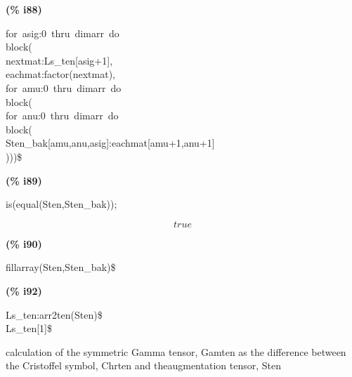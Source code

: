 \documentclass[fleqn]{article}
\begin{document}
\noindent
\begin{minipage}[t]{4.000000em}\color{red}\bfseries
(\% i88)	
\end{minipage}
\begin{minipage}[t]{\textwidth}\color{blue}
for\ asig:0\ thru\ dimarr\ do\\
block(\\
nextmat:Ls\_ten[asig+1],\\
eachmat:factor(nextmat),\\
for\ amu:0\ thru\ dimarr\ do\\
block(\\
for\ anu:0\ thru\ dimarr\ do\\
block(\\
Sten\_bak[amu,anu,asig]:eachmat[amu+1,anu+1]\\
)))\$
\end{minipage}

\noindent%



\noindent
\begin{minipage}[t]{4.000000em}\color{red}\bfseries
(\% i89)	
\end{minipage}
\begin{minipage}[t]{\textwidth}\color{blue}
is(equal(Sten,Sten\_bak));
\end{minipage}
\[\displaystyle \tag{\% o89} 
true\mbox{}
\]


\noindent
\begin{minipage}[t]{4.000000em}\color{red}\bfseries
(\% i90)	
\end{minipage}
\begin{minipage}[t]{\textwidth}\color{blue}
fillarray(Sten,Sten\_bak)\$
\end{minipage}

\noindent%



\noindent
\begin{minipage}[t]{4.000000em}\color{red}\bfseries
(\% i92)	
\end{minipage}
\begin{minipage}[t]{\textwidth}\color{blue}
Ls\_ten:arr2ten(Sten)\$\\
Ls\_ten[1]\$
\end{minipage}

\noindent%

calculation of the symmetric Gamma tensor, Gamten as the difference between the Cristoffel symbol, Chrten and theaugmentation tensor, Sten
\end{document}
